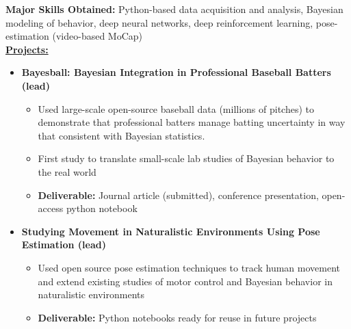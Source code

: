 
\smallskip
{\small{\color{skills}\textbf{Major Skills Obtained:}} Python-based data acquisition and analysis, Bayesian modeling of behavior, deep neural networks, deep reinforcement learning, pose-estimation (video-based MoCap)} \\
\smallskip
{\color{accent}\underline{\textbf{Projects:}}}\\
\begin{adjustwidth}{0.5em}{0pt}
    \begin{itemize}
    \item[\color{accent}\ding{224}] {\color{emphasis}\textbf{Bayesball: Bayesian Integration in Professional Baseball Batters (lead) \hfill {}}}\\
        \begin{itemize}
            \item Used large-scale open-source baseball data (millions of pitches) to demonstrate that professional batters manage batting uncertainty in way that consistent with Bayesian statistics.
            \item First study to translate small-scale lab studies of Bayesian behavior to the real world
            \item {\color{pink} \textbf{Deliverable:}} Journal article (submitted), conference presentation, open-access python notebook
        \end{itemize}
    \smallskip
    \item[\color{accent}\ding{224}] {\color{emphasis}\textbf{Studying Movement in Naturalistic Environments Using Pose Estimation (lead)}}\\
    \smallskip
        \begin{itemize}
            \item Used open source pose estimation techniques to track human movement and extend existing studies of motor control and Bayesian behavior in naturalistic environments
            \item {\color{pink} \textbf{Deliverable:}} Python notebooks ready for reuse in future projects 
        \end{itemize}
    \end{itemize}
\end{adjustwidth}
\vspace{-0.5em}
\divider

